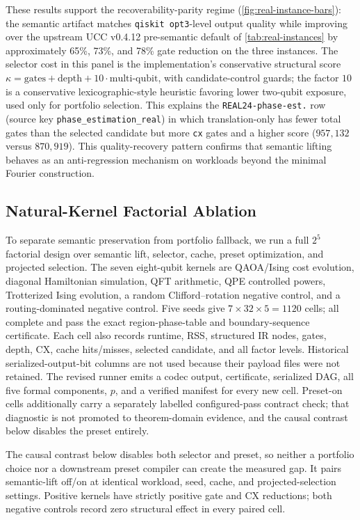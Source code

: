 \documentclass[aps,prx,reprint,floatfix,superscriptaddress]{revtex4-2}
\begin{document}
These results support the recoverability-parity regime
(\cref{fig:real-instance-bars}): the semantic artifact matches
\texttt{qiskit opt3}-level output quality while improving over the
upstream UCC v0.4.12 pre-semantic default of \cref{tab:real-instances} by
approximately 65\%, 73\%, and 78\% gate reduction on the three instances.
The selector cost in this panel is the implementation's conservative
structural score $\kappa = \text{gates} + \text{depth} +
10\cdot\text{multi-qubit}$, with candidate-control guards; the factor
$10$ is a conservative lexicographic-style heuristic favoring lower
two-qubit exposure, used only for portfolio selection. This explains the
\texttt{REAL24-phase-est.} row (source key
\texttt{phase\_estimation\_real}) in which translation-only has fewer
total gates than the selected candidate but more \texttt{cx} gates and a
higher score ($957{,}132$ versus $870{,}919$). This quality-recovery
pattern confirms that semantic lifting behaves as an anti-regression
mechanism on workloads beyond the minimal Fourier construction.

\subsection{Natural-Kernel Factorial Ablation}
\label{sec:natural-factorial}

To separate semantic preservation from portfolio fallback, we run a full
$2^5$ factorial design over semantic lift, selector, cache, preset
optimization, and projected selection.  The seven eight-qubit kernels are
QAOA/Ising cost evolution, diagonal Hamiltonian simulation, QFT arithmetic,
QPE controlled powers, Trotterized Ising evolution, a random
Clifford--rotation negative control, and a routing-dominated negative control.
Five seeds give $7\times32\times5=1120$ cells; all complete and pass the exact
region-phase-table and boundary-sequence certificate.  Each cell also records
runtime, RSS, structured IR nodes, gates, depth, CX, cache hits/misses,
selected candidate, and all factor levels.  Historical serialized-output-bit
columns are not used because their payload files were not retained.  The
revised runner emits a codec output, certificate, serialized DAG, all five
formal components, $p$, and a verified manifest for every new cell.
Preset-on cells additionally carry a separately labelled configured-pass
contract check; that diagnostic is not promoted to theorem-domain evidence,
and the causal contrast below disables the preset entirely.

The causal contrast below disables both selector and preset, so neither a
portfolio choice nor a downstream preset compiler can create the measured
gap.  It pairs semantic-lift off/on at identical workload, seed, cache, and
projected-selection settings.  Positive kernels have strictly positive gate
and CX reductions; both negative controls record zero structural effect in
every paired cell.
\end{document}
